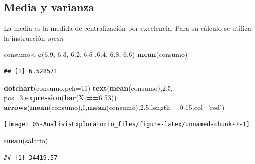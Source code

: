 \documentclass[]{book}
\newenvironment{Shaded}{\begin{snugshade}}{\end{snugshade}}
\newcommand{\DataTypeTok}[1]{\textcolor[rgb]{0.13,0.29,0.53}{#1}}
\newcommand{\DecValTok}[1]{\textcolor[rgb]{0.00,0.00,0.81}{#1}}
\newcommand{\FloatTok}[1]{\textcolor[rgb]{0.00,0.00,0.81}{#1}}
\newcommand{\KeywordTok}[1]{\textcolor[rgb]{0.13,0.29,0.53}{\textbf{#1}}}
\newcommand{\NormalTok}[1]{#1}
\newcommand{\OperatorTok}[1]{\textcolor[rgb]{0.81,0.36,0.00}{\textbf{#1}}}
\newcommand{\StringTok}[1]{\textcolor[rgb]{0.31,0.60,0.02}{#1}}
\begin{document}
\hypertarget{media-y-varianza}{%
\subsection{Media y varianza}\label{media-y-varianza}}

La media es la medida de centralización por excelencia. Para su cálculo
se utiliza la instrucción \emph{mean}

\begin{Shaded}
\begin{Highlighting}[]
\NormalTok{consumo<-}\KeywordTok{c}\NormalTok{(}\FloatTok{6.9}\NormalTok{, }\FloatTok{6.3}\NormalTok{, }\FloatTok{6.2}\NormalTok{, }\FloatTok{6.5}\NormalTok{ ,}\FloatTok{6.4}\NormalTok{, }\FloatTok{6.8}\NormalTok{, }\FloatTok{6.6}\NormalTok{)}
\KeywordTok{mean}\NormalTok{(consumo)}
\end{Highlighting}
\end{Shaded}

\begin{verbatim}
## [1] 6.528571
\end{verbatim}

\begin{Shaded}
\begin{Highlighting}[]
\KeywordTok{dotchart}\NormalTok{(consumo,}\DataTypeTok{pch=}\DecValTok{16}\NormalTok{)}
\KeywordTok{text}\NormalTok{(}\KeywordTok{mean}\NormalTok{(consumo),}\FloatTok{2.5}\NormalTok{, }\DataTypeTok{pos=}\DecValTok{3}\NormalTok{,}\KeywordTok{expression}\NormalTok{(}\KeywordTok{bar}\NormalTok{(X)}\OperatorTok{==}\FloatTok{6.53}\NormalTok{))}
\KeywordTok{arrows}\NormalTok{(}\KeywordTok{mean}\NormalTok{(consumo),}\DecValTok{0}\NormalTok{,}\KeywordTok{mean}\NormalTok{(consumo),}\FloatTok{2.5}\NormalTok{,}\DataTypeTok{length =} \FloatTok{0.15}\NormalTok{,}\DataTypeTok{col=}\StringTok{'red'}\NormalTok{)}
\end{Highlighting}
\end{Shaded}

\begin{center}\texttt{[image: 05-AnalisisExploratorio\_files/figure-latex/unnamed-chunk-7-1]} \end{center}

\begin{Shaded}
\begin{Highlighting}[]
\KeywordTok{mean}\NormalTok{(salario)}
\end{Highlighting}
\end{Shaded}

\begin{verbatim}
## [1] 34419.57
\end{verbatim}
\end{document}
